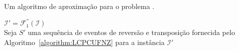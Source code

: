 \begin{algorithm}[!tbh]
  \caption{Um algoritmo de aproximação para o problema \SbFIRT{}.\label{algorithm:KZFLZWRM}}
  $\mathcal{I}' = \mathcal{F}_{1}^{''}(\mathcal{I})$ \\
  Seja $S'$ uma sequência de eventos de reversão e transposição fornecida pelo Algoritmo~\ref{algorithm:LCPCUFNZ} para a instância $\mathcal{I}'$ \\
\end{algorithm}